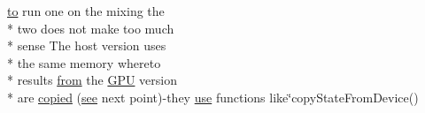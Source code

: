 \begin{DoxyCompactItemize}
\item 
\hyperlink{README_8txt_add1f2ee32acc15ef77f839d4382c9768}{to} run one on the mixing the \\*
two does not make too much \\*
sense The host version uses \\*
the same memory whereto \\*
results \hyperlink{README_8txt_aa96a977025ecc6f44756d8c7ce4f7674}{from} the \hyperlink{modelSpec_8h_a39cb9803524b6f3b783344b2f89867b4}{G\+P\+U} version \\*
are \hyperlink{README_8txt_a04020a0866e0d07d59dff6f825f58683}{copied} (\hyperlink{userproject_2MBody__userdef__project_2README_8txt_abf32849f9c3ee45276ee0d4aa4c07e0b}{see} next point)-\/they \hyperlink{README_8txt_acf386c48a14a2099c9220d6bcde40fc8}{use} functions like\char`\"{}copy\+State\+From\+Device()
\end{DoxyCompactItemize}
